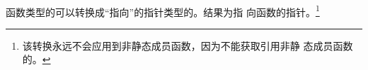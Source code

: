 \paragraph{} %
函数类型的\lvalue{}可以转换成“指向”的指针类型的\prvalue{}。结果为指
向函数的指针。\footnote{该转换永远不会应用到非静态成员函数，因为不能获取引用非静
态成员函数的\lvalue{}。}
